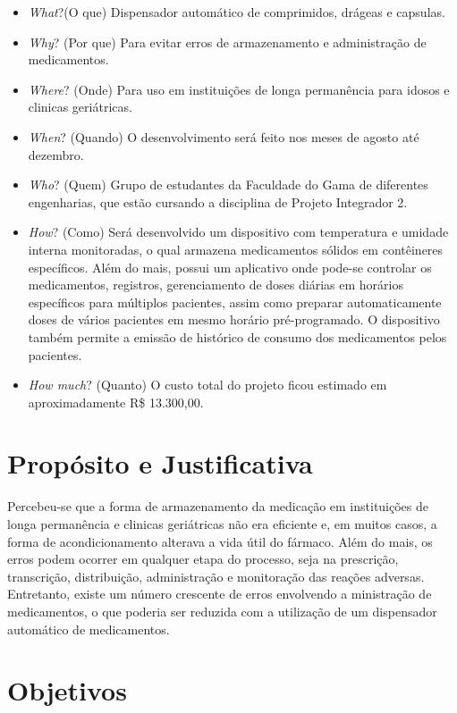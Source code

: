 \begin{apendicesenv}
\begin{itemize}
\item \textit{What}?(O que) Dispensador automático de comprimidos, drágeas e capsulas.
\item \textit{Why}? (Por que) Para evitar erros de armazenamento e administração de medicamentos.
\item \textit{Where}? (Onde) Para uso em instituições de longa permanência para idosos e clinicas geriátricas.
\item \textit{When}? (Quando) O desenvolvimento será feito nos meses de agosto até dezembro.
\item \textit{Who}? (Quem) Grupo de estudantes da Faculdade do Gama de diferentes engenharias, que estão cursando a disciplina de Projeto Integrador 2.
\item \textit{How}? (Como) Será desenvolvido um dispositivo com temperatura e umidade interna monitoradas, o qual armazena medicamentos sólidos em contêineres específicos. Além do mais, possui um aplicativo onde pode-se controlar os medicamentos, registros, gerenciamento de doses diárias em horários específicos para múltiplos pacientes, assim como preparar automaticamente doses de vários pacientes em mesmo horário pré-programado. O dispositivo também permite a emissão de histórico de consumo dos medicamentos pelos pacientes.


\item \textit{How much}? (Quanto) O custo total do projeto ficou estimado em aproximadamente R\$ 13.300,00.
\end{itemize}

\section{Propósito e Justificativa}

Percebeu-se que a forma de armazenamento da medicação em instituições de longa permanência e clinicas geriátricas não era eficiente e, em muitos casos, a forma de acondicionamento alterava a vida útil do fármaco. Além do mais, os erros podem ocorrer em qualquer etapa do processo, seja na prescrição, transcrição, distribuição, administração e monitoração das reações adversas. Entretanto, existe um número crescente de erros envolvendo a ministração de medicamentos, o que poderia ser reduzida com a utilização de um dispensador automático de medicamentos.

\section{Objetivos}


\end{apendicesenv}
